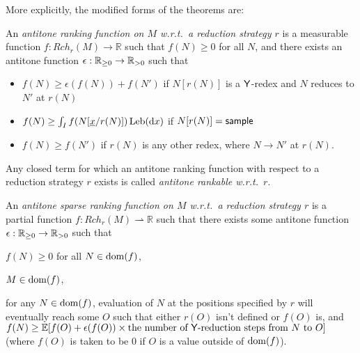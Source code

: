 More explicitly, the modified forms of the theorems are:
\begin{definition}
An \emph{antitone ranking function on $M$ w.r.t.~a reduction strategy $r$} is a measurable function $f:\mathit{Rch}_r(M) \to \mathbb{R}$ such that $f(N) \geq 0$ for all $N$, and there exists an antitone function $\epsilon : \mathbb{R}_{{\geq}0} \to \mathbb{R}_{{>}0}$ such that
\begin{itemize}
    \item $f(N) \geq \epsilon(f(N)) + f(N')$ if $N[r(N)]$ is a $\mathsf{Y}$-redex and $N$ reduces to $N'$ at $r(N)$
    \item $f(N) \geq \int_I f(N[\underline{x}/r(N)]) \, \mathrm{Leb}(\mathrm{d}x)$ if $N[r(N)] = \mathsf{sample}$

    \item $f(N) \geq f(N')$ if $r(N)$ is any other redex, where $N \to N'$ at $r(N)$.
\end{itemize}
Any closed term for which an antitone ranking function with respect to a reduction strategy $r$ exists is called \emph{antitone rankable w.r.t.~$r$}. 
\end{definition}

\begin{definition}
An \emph{antitone sparse ranking function on $M$ w.r.t.~a reduction strategy $r$} is a partial function $f : \mathit{Rch}_r(M) \rightharpoonup \mathbb R$ such that there exists some antitone function $\epsilon : \mathbb{R}_{{\geq}0} \to \mathbb{R}_{{>}0}$ such that
\begin{inparaenum}[(i)]
    \item $f(N) \geq 0$ for all $N \in \operatorname{dom}(f)$,
    \item $M \in \operatorname{dom}(f)$,
    \item for any $N \in \operatorname{dom}(f)$, evaluation of $N$ at the positions specified by $r$ will eventually reach some $O$ such that either $r(O)$ isn't defined or $f(O)$ is, and $f(N) \geq \mathbb E[f(O) + \epsilon(f(O)) \times \text{the number of $\tY$-reduction steps from $N$ to $O$}]$ (where $f(O)$ is taken to be 0 if $O$ is a value outside of $\operatorname{dom}(f)$).
\end{inparaenum}
\iffalse
\begin{itemize}
    \item $f(N) \geq 0$ for all $N$ where $f$ is defined.
    \item $f$ is defined at $M$.
    \item For any $N$ in the domain of definition of $f$, evaluation of $N$ at the positions specified by $r$ will eventually reach some $O$ such that either $r(O)$ isn't defined or $f(O)$ is, and $f(N) \geq \mathbb E[f(O) + \epsilon(f(O)) \times \text{the number of $\tY$-reduction steps from $N$ to $O$}]$ (where $f(O)$ is taken to be 0 if $O$ is a value outside of the domain of $f$).
\end{itemize}
\fi
\end{definition}

